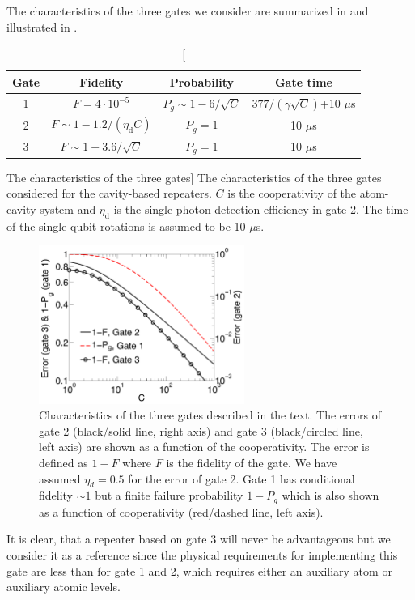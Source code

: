The characteristics of the three gates we consider are summarized in
 and illustrated in .
\begin{table} 
\centering
\begin{tabular}{|c|c|c|c|}
\hline
Gate & Fidelity & Probability & Gate time  \\ \hline
1  & $F=4\cdot10^{-5}$ & $P_{g}\sim1-6/\sqrt{C}$ & $377/(\gamma\sqrt{C})$+10 $\mu$s\\ \hline
2 & $F\sim1-1.2/(\eta_{\text{d}}C)$ & $P_{g}=1$ &10 $\mu$s  \\ \hline
3 & $F\sim1-3.6/\sqrt{C}$ & $P_{g}=1$ &10 $\mu$s \\ \hline
\end{tabular}
\caption
[The characteristics of the three gates]
{The characteristics of the three gates considered for the
cavity-based repeaters. $C$ is the cooperativity of the atom-cavity system and
$\eta_{\text{d}}$ is the single photon detection efficiency in gate 2. The time
of the single qubit rotations is assumed to be 10 $\mu$s. }
\label{tab:table2}
\end{table}
\begin{figure} 
\centering
\includegraphics[width=0.6\textwidth]{./figs_Borregaard_PRA2015/figureX2}
\caption[CNOT gates comparison]{Characteristics of the three gates described in
the text. The errors of gate 2 (black/solid line, right axis) and gate 3
(black/circled line, left axis) are shown as a function of the cooperativity.
The error is defined as $1-F$ where $F$ is the fidelity of the gate. We have
assumed $\eta_{d}=0.5$ for the error of gate 2. Gate 1 has conditional fidelity
$\sim1$ but a finite failure probability $1-P_{g}$ which is also shown as a
function of cooperativity (red/dashed line, left axis).}
\label{fig:figureX2}
\end{figure} 
It is clear, that a repeater based on gate 3 will never be advantageous but we
consider it as a reference since the physical requirements for implementing this
gate are less than for gate 1 and 2, which requires either an auxiliary atom or
auxiliary atomic levels.

